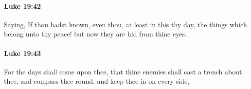 		\paragraph{Luke 19:42} %
			\label{LUKE-19-42}

			Saying, If thou hadst known, even thou, at least in this thy day, the things which belong unto thy peace! but now they are hid from thine eyes.

			\begin{framed}
			\scriptsize
				\begin{compactdesc}
					\item[SBLG] 
				\end{compactdesc}
			\end{framed}

		\paragraph{Luke 19:43} %
			\label{LUKE-19-43}

			For the days shall come upon thee, that thine enemies shall cast a trench about thee, and compass thee round, and keep thee in on every side,

